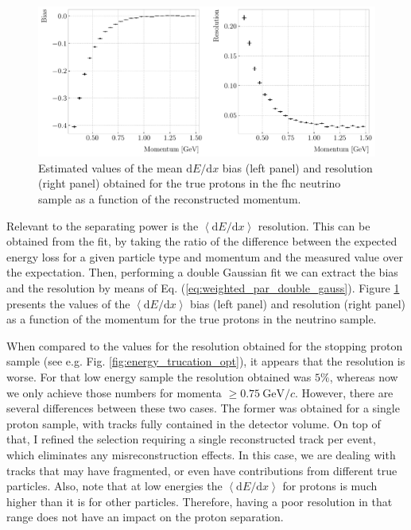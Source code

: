 \begin{figure}[t]
	\centering
	\includegraphics[width=.90\linewidth]{Images/GArSoft_PID/dEdx/proton_dEdx_momentum.pdf}
	\caption[Estimated values of the mean $\mathrm{d}E/\mathrm{d}x$ bias and resolution obtained for the true protons in a \gls{fhc} neutrino sample as a function of the momentum.]{Estimated values of the mean $\mathrm{d}E/\mathrm{d}x$ bias (left panel) and resolution (right panel) obtained for the true protons in the \gls{fhc} neutrino sample as a function of the reconstructed momentum.}
	\label{fig:proton_dEdx_momentum}
\end{figure}

Relevant to the separating power is the $\left<\mathrm{d}E/\mathrm{d}x\right>$ resolution. This can be obtained from the fit, by taking the ratio of the difference between the expected energy loss for a given particle type and momentum and the measured value over the expectation. Then, performing a double Gaussian fit we can extract the bias and the resolution by means of Eq. (\ref{eq:weighted_par_double_gauss}). Figure \ref{fig:proton_dEdx_momentum} presents the values of the $\left<\mathrm{d}E/\mathrm{d}x\right>$ bias (left panel) and resolution (right panel) as a function of the momentum for the true protons in the neutrino sample.

When compared to the values for the resolution obtained for the stopping proton sample (see e.g. Fig. \ref{fig:energy_trucation_opt}), it appears that the resolution is worse. For that low energy sample the resolution obtained was $5\%$, whereas now we only achieve those numbers for momenta $\geq 0.75~\mathrm{GeV}/c$. However, there are several differences between these two cases. The former was obtained for a single proton sample, with tracks fully contained in the detector volume. On top of that, I refined the selection requiring a single reconstructed track per event, which eliminates any misreconstruction effects. In this case, we are dealing with tracks that may have fragmented, or even have contributions from different true particles. Also, note that at low energies the $\left<\mathrm{d}E/\mathrm{d}x\right>$ for protons is much higher than it is for other particles. Therefore, having a poor resolution in that range does not have an impact on the proton separation.

